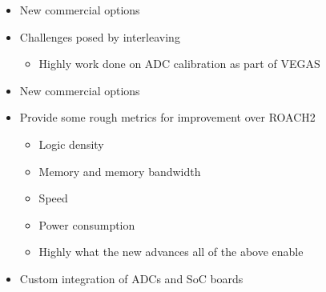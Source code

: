 \documentclass[10pt]{myNSF}
\begin{document}

\begin{itemize}
\item{New commercial options}
\item{Challenges posed by interleaving}
  \begin{itemize}
  \item{Highly work done on ADC calibration as part of VEGAS}
  \end{itemize}
\end{itemize}

\begin{itemize}
\item{New commercial options}
\item{Provide some rough metrics for improvement over ROACH2}
  \begin{itemize}
  \item{Logic density}
  \item{Memory and memory bandwidth}
  \item{Speed}
  \item{Power consumption}
  \item{Highly what the new advances all of the above enable}
  \end{itemize}
\item{Custom integration of ADCs and SoC boards}
\end{itemize}

\end{document}

